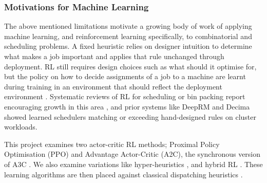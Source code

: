 \documentclass[12pt]{article}
\begin{document}
\subsubsection{Motivations for Machine Learning}
The above mentioned limitations motivate a growing body of work of applying machine learning, and reinforcement learning specifically, to combinatorial and scheduling problems. A fixed heuristic relies on designer intuition to determine what makes a job important and applies that rule unchanged through deployment. RL still requires design choices such as what should it optimise for, but the policy on how to decide assignments of a job to a machine are learnt during training in an environment that should reflect the deployment environment \cite{ml_ra_litrev2025}. Systematic reviews of RL for scheduling or bin packing report encouraging growth in this area \cite{DAHMANI2025100616}, and prior systems like DeepRM \cite{mao2016deeprm} and Decima \cite{mao2019decima} showed learned schedulers matching or exceeding hand-designed rules on cluster workloads.
\newline


This project examines two actor-critic RL methods; Proximal Policy Optimisation (PPO) and Advantage Actor-Critic (A2C), the synchronous version of A3C \cite{schulman2017ppo, mnih2016a3c, apxml_a2c_a3c_2026, aigreeksActorCritic, chadia2023understandingRL, konda1999actorcritic}. We also examine variations like hyper-heuristics \cite{burke2013hyperheuristicsurvey, lassoued2026hyperheuristic, cie2025dispatchruleselection}, and hybrid RL \cite{min2022atctuning, chen2024drlgphh}. These learning algorithms are then placed against classical dispatching heuristics \cite{vepsalainen1987atc, ortools}.
    
\end{document}
